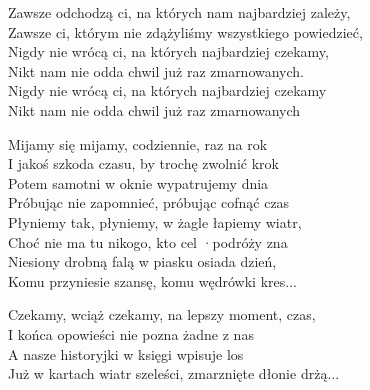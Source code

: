 \begin{text}
    Zawsze odchodzą ci, na których nam najbardziej zależy,\\
    Zawsze ci, którym nie zdążyliśmy wszystkiego powiedzieć,\\
    Nigdy nie wrócą ci, na których najbardziej czekamy,\\
    Nikt nam nie odda chwil już raz zmarnowanych.\\
    Nigdy nie wrócą ci, na których najbardziej czekamy\\
    Nikt nam nie odda chwil już raz zmarnowanych

    Mijamy się mijamy, codziennie, raz na rok\\
    I jakoś szkoda czasu, by trochę zwolnić krok\\
    Potem samotni w oknie wypatrujemy dnia\\
    Próbując nie zapomnieć, próbując cofnąć czas\\

    Płyniemy tak, płyniemy, w żagle łapiemy wiatr,\\
    Choć nie ma tu nikogo, kto cel ·podróży zna\\
    Niesiony drobną falą w piasku osiada dzień,\\
    Komu przyniesie szansę, komu wędrówki kres...

    Czekamy, wciąż czekamy, na lepszy moment, czas,\\
    I końca opowieści nie pozna żadne z nas\\
    A nasze historyjki w księgi wpisuje los\\
    Już w kartach wiatr szeleści, zmarznięte dłonie drżą...
\end{text}
\begin{chord}

\end{chord}